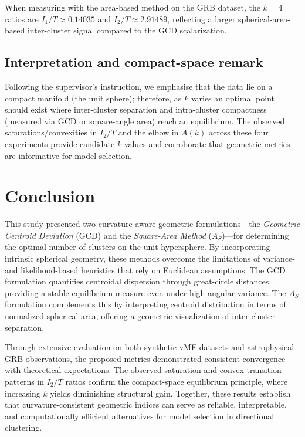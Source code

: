 \documentclass[12pt,a4paper]{report}
\begin{document}
When measuring with the area-based method on the GRB dataset, the $k=4$ ratios are 
$I_1/T \approx 0.14035$ and $I_2/T \approx 2.91489$, reflecting a larger spherical-area-based 
inter-cluster signal compared to the GCD scalarization.

\clearpage
\subsection{Interpretation and compact-space remark}
Following the supervisor's instruction, we emphasise that the data lie on a compact manifold 
(the unit sphere); therefore, as $k$ varies an optimal point should exist where inter-cluster 
separation and intra-cluster compactness (measured via GCD or square-angle area) reach an 
equilibrium. The observed saturations/convexities in $I_2/T$ and the elbow in $A(k)$ across 
these four experiments provide candidate $k$ values and corroborate that geometric metrics 
are informative for model selection.

\section{Conclusion}
This study presented two curvature-aware geometric formulations—the \textit{Geometric Centroid Deviation} (GCD) and the \textit{Square-Area Method} ($A_S$)—for determining the optimal number of clusters on the unit hypersphere.  
By incorporating intrinsic spherical geometry, these methods overcome the limitations of variance- and likelihood-based heuristics that rely on Euclidean assumptions.  
The GCD formulation quantifies centroidal dispersion through great-circle distances, providing a stable equilibrium measure even under high angular variance.  
The $A_S$ formulation complements this by interpreting centroid distribution in terms of normalized spherical area, offering a geometric visualization of inter-cluster separation.  

Through extensive evaluation on both synthetic vMF datasets and astrophysical GRB observations, the proposed metrics demonstrated consistent convergence with theoretical expectations.  
The observed saturation and convex transition patterns in $I_2/T$ ratios confirm the compact-space equilibrium principle, where increasing $k$ yields diminishing structural gain.  
Together, these results establish that curvature-consistent geometric indices can serve as reliable, interpretable, and computationally efficient alternatives for model selection in directional clustering.
\end{document}
